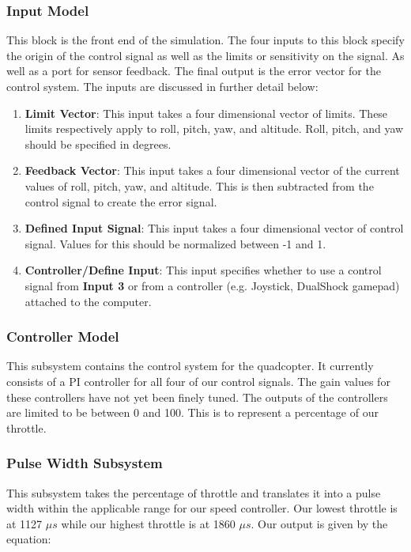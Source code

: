 \subsubsection{Input Model}
This block is the front end of the simulation.  The four inputs to this block specify the origin of the control signal as well as the limits or sensitivity on the signal.  As well as a port for sensor feedback.  The final output is the error vector for the control system.  The inputs are discussed in further detail below:
\begin{enumerate}
	\item \textbf{Limit Vector}:  This input takes a four dimensional vector of limits.  These limits respectively apply to roll, pitch, yaw, and altitude.  Roll, pitch, and yaw should be specified in degrees.
	\item \textbf{Feedback Vector}: This input takes a four dimensional vector of the current values of roll, pitch, yaw, and altitude.  This is then subtracted from the control signal to create the error signal.
	\item \textbf{Defined Input Signal}:  This input takes a four dimensional vector of control signal.  Values for this should be normalized between -1 and 1.
	\item \textbf{Controller/Define Input}:  This input specifies whether to use a control signal from \textbf{Input 3} or from a controller (e.g. Joystick, DualShock gamepad) attached to the computer.
\end{enumerate}

\subsubsection{Controller Model}
This subsystem contains the control system for the quadcopter.  It currently consists of a PI controller for all four of our control signals.  The gain values for these controllers have not yet been finely tuned.  The outputs of the controllers are limited to be between 0 and 100.  This is to represent a percentage of our throttle.

\subsubsection{Pulse Width Subsystem}
This subsystem takes the percentage of throttle and translates it into a pulse width within the applicable range for our speed controller.  Our lowest throttle is at 1127 $\mu s$ while our highest throttle is at 1860 $\mu s$.  Our output is given by the equation:


